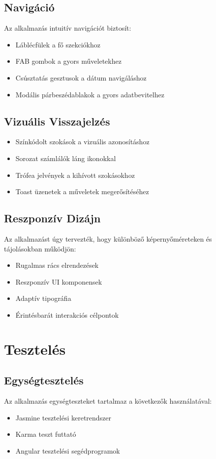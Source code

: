 \documentclass[12pt,a4paper]{report}
\begin{document}
\section{Navigáció}
Az alkalmazás intuitív navigációt biztosít:
\begin{itemize}
    \item Láblécfülek a fő szekciókhoz
    \item FAB gombok a gyors műveletekhez
    \item Csúsztatás gesztusok a dátum navigáláshoz
    \item Modális párbeszédablakok a gyors adatbevitelhez
\end{itemize}

\section{Vizuális Visszajelzés}
\begin{itemize}
    \item Színkódolt szokások a vizuális azonosításhoz
    \item Sorozat számlálók láng ikonokkal
    \item Trófea jelvények a kihívott szokásokhoz
    \item Toast üzenetek a műveletek megerősítéséhez
\end{itemize}

\section{Reszponzív Dizájn}
Az alkalmazást úgy tervezték, hogy különböző képernyőméreteken és tájolásokban működjön:
\begin{itemize}
    \item Rugalmas rács elrendezések
    \item Reszponzív UI komponensek
    \item Adaptív tipográfia
    \item Érintésbarát interakciós célpontok
\end{itemize}

\chapter{Tesztelés}

\section{Egységtesztelés}
Az alkalmazás egységteszteket tartalmaz a következők használatával:
\begin{itemize}
    \item Jasmine tesztelési keretrendszer
    \item Karma teszt futtató
    \item Angular tesztelési segédprogramok
\end{itemize}
\end{document}
